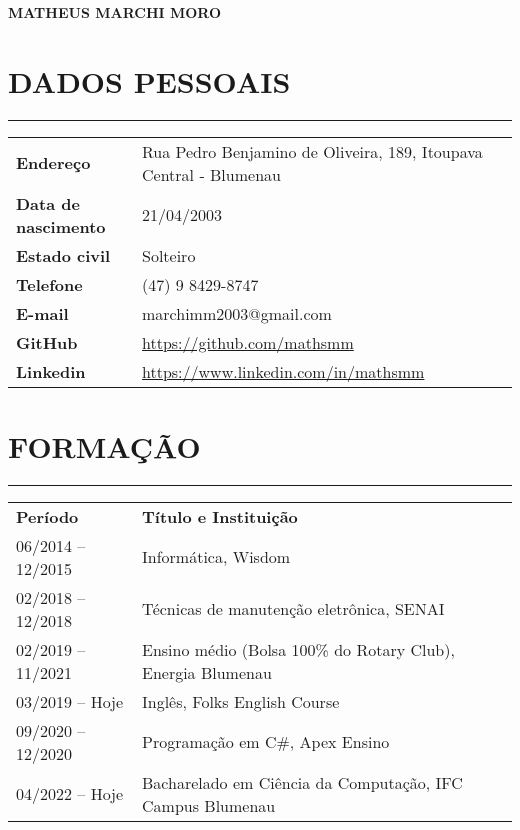 \documentclass[11pt]{article}
\begin{document}
\begin{flushleft}
    \Huge \textbf{MATHEUS MARCHI MORO}
\end{flushleft}

\bigskip

\section*{DADOS PESSOAIS}
\hrule
\begin{flushleft}
\begin{tabular}{p{0.25\linewidth}p{0.8\linewidth}}
    \vspace{0.1em}\textbf{Endereço} & \vspace{0.1em}Rua Pedro Benjamino de Oliveira, 189, Itoupava Central - Blumenau \\
    \textbf{Data de nascimento} & 21/04/2003 \\
    \textbf{Estado civil} & Solteiro \\
    \textbf{Telefone} & (47) 9 8429-8747 \\
    \textbf{E-mail} & marchimm2003@gmail.com \\
    \textbf{GitHub} & \url{https://github.com/mathsmm} \\
    \textbf{Linkedin} & \url{https://www.linkedin.com/in/mathsmm}
\end{tabular}
\end{flushleft}

\vspace{1.0em}\section*{FORMAÇÃO}
\hrule
\begin{flushleft}
\begin{tabular}{p{0.25\linewidth}p{0.8\linewidth}}
    \vspace{0.1em}\textbf{Período} & \vspace{0.1em}\textbf{Título e Instituição} \\
    06/2014 -- 12/2015 & Informática, Wisdom \\
    02/2018 -- 12/2018 & Técnicas de manutenção eletrônica, SENAI \\
    02/2019 -- 11/2021 & Ensino médio (Bolsa 100\% do Rotary Club), Energia Blumenau \\
    03/2019 -- Hoje & Inglês, Folks English Course \\
    09/2020 -- 12/2020 & Programação em C\#, Apex Ensino \\
    04/2022 -- Hoje & Bacharelado em Ciência da Computação, IFC Campus Blumenau \\
\end{tabular}
\end{flushleft}
\end{document}
